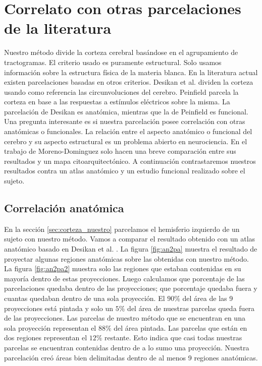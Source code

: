 \section{Correlato con otras parcelaciones de la literatura}

Nuestro m\'etodo divide la corteza cerebral bas\'andose en el 
agrupamiento de tractogramas. El criterio usado es puramente estructural.
Solo usamos informaci\'on sobre la estructura f\'isica de la materia
blanca. En la literatura actual existen parcelaciones basadas en otros
criterios. Desikan et al. \cite{Desikan2006} dividen la corteza usando
como referencia las circunvoluciones del cerebro. Peinfield 
\cite{Penfield1954} parcela la corteza en base a las respuestas a 
est\'imulos el\'ectricos sobre la misma. La parcelaci\'on de Desikan es
anat\'omica, mientras que la de Peinfield es funcional. Una pregunta
interesante es si nuestra parcelaci\'on posee correlaci\'on con otras
anat\'omicas o funcionales. La relaci\'on entre el aspecto anat\'omico o
funcional del cerebro y su aspecto estructural es un problema abierto en
neurociencia.  En el trabajo de Moreno-Dominguez solo hacen una breve
comparaci\'on entre sus resultados y un mapa citoarquitect\'onico. A 
continuaci\'on contrastaremos nuestros resultados contra un atlas 
anat\'omico y un estudio funcional realizado sobre el sujeto.  \\


\subsection{Correlaci\'on anat\'omica}
\label{sec:corr_anatomica}

En la secci\'on \ref{sec:corteza_nuestro} parcelamos el hemisferio 
izquierdo de un sujeto con nuestro m\'etodo. Vamos a comparar el resultado
obtenido con un atlas anat\'omico basado en Desikan et al. 
\cite{Desikan2006}. La figura \ref{fig:an2pa} muestra el resultado de proyectar algunas regiones anat\'omicas sobre las obtenidas con nuestro
m\'etodo. La figura \ref{fig:an2pa2} muestra solo las regiones que estaban
contenidas en su mayor\'ia dentro de estas proyecciones. Luego calculamos
que porcentaje de las parcelaciones quedaba dentro de las proyecciones;
que porcentaje quedaba fuera y cuantas quedaban dentro de una sola 
proyecci\'on. El $90\%$ del \'area de las 9 proyecciones est\'a pintada y
solo un $5\%$ del \'area de nuestras parcelas queda fuera de las
proyecciones. Las parcelas de nuestro m\'etodo que se encuentran en una
sola proyecci\'on representan el $88\%$ del \'area pintada. Las parcelas
que est\'an en dos regiones representan el $12\%$ restante. Esto indica
que casi todas nuestras parcelas se encuentran contenidas dentro de a lo
sumo una proyecci\'on. Nuestra parcelaci\'on cre\'o \'areas bien
delimitadas dentro de al menos 9 regiones anat\'omicas. \\

